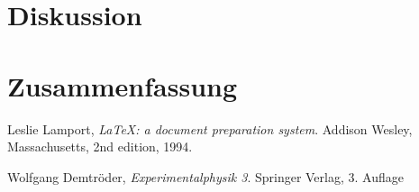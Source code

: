 \documentclass[10pt, a4paper]{article}
\begin{document}
\section{Diskussion}

\section{Zusammenfassung}


\begin{thebibliography}{9}

  Leslie Lamport,
  \emph{\LaTeX: a document preparation system}.
  Addison Wesley, Massachusetts,
  2nd edition,
  1994.
  
	Wolfgang Demtröder,
	\emph{Experimentalphysik 3}.
	Springer Verlag,
	3. Auflage
\end{thebibliography}


\newpage

\begin{appendix}

\end{appendix}
\end{document}
